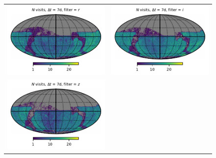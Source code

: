 \documentclass[preprintm,linenumbers]{aastex631}
\begin{document}
\begin{figure}
\begin{tabular}{@{}c@{}c@{}}
				\includegraphics{results/skymaps/skymap_first_year_one_snap_v4_0_10yrs_db_noDD_noTwi_tscale-7_nside-256_doAllTemplateMetrics_reduceCount_r_noDD_noTwi.pdf} &
				\includegraphics{results/skymaps/skymap_first_year_one_snap_v4_0_10yrs_db_noDD_noTwi_tscale-7_nside-256_doAllTemplateMetrics_reduceCount_i_noDD_noTwi.pdf} \\
				\includegraphics{results/skymaps/skymap_first_year_one_snap_v4_0_10yrs_db_noDD_noTwi_tscale-7_nside-256_doAllTemplateMetrics_reduceCount_z_noDD_noTwi.pdf} &

\end{tabular}
\end{figure}
\end{document}
